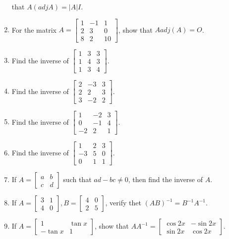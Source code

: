 \begin{enumerate}
  that $A(adj A) = |A|I$.
\item For the matrix $A = \begin{bmatrix}1 & -1 & 1 \\ 2 & 3 & 0 \\ 8 & 2 & 10\end{bmatrix}$, show that $A adj(A) = O$.
\item Find the inverse of $\begin{bmatrix}1 & 3 & 3 \\ 1 & 4 & 3 \\ 1 & 3 & 4\end{bmatrix}$.
\item Find the inverse of $\begin{bmatrix}2 & -3 & 3 \\ 2 & 2 & 3 \\ 3 & -2 & 2\end{bmatrix}$.
\item Find the inverse of $\begin{bmatrix}1 & -2 & 3 \\ 0 & -1 & 4 \\ -2 & 2 & 1\end{bmatrix}$.
\item Find the inverse of $\begin{bmatrix}1 & 2 & 3 \\ -3 & 5 & 0 \\ 0 & 1 & 1\end{bmatrix}$.
\item If $A = \begin{bmatrix}a & b \\ c & d\end{bmatrix}$ such that $ad - bc \neq 0$, then find the inverse of $A$.
\item If $A = \begin{bmatrix}3 & 1 \\ 4 & 0\end{bmatrix}, B = \begin{bmatrix} 4 & 0 \\ 2 & 5 \end{bmatrix}$, verify thet $(AB)^{-1}
  = B^{-1}A^{-1}$.
\item If $A = \begin{bmatrix}1 & \tan x \\ -\tan x & 1\end{bmatrix}$, show that $AA^{-1} = \begin{bmatrix}\cos 2x & -\sin 2x
    \\ \sin 2x & \cos 2x\end{bmatrix}$.

\end{enumerate}
